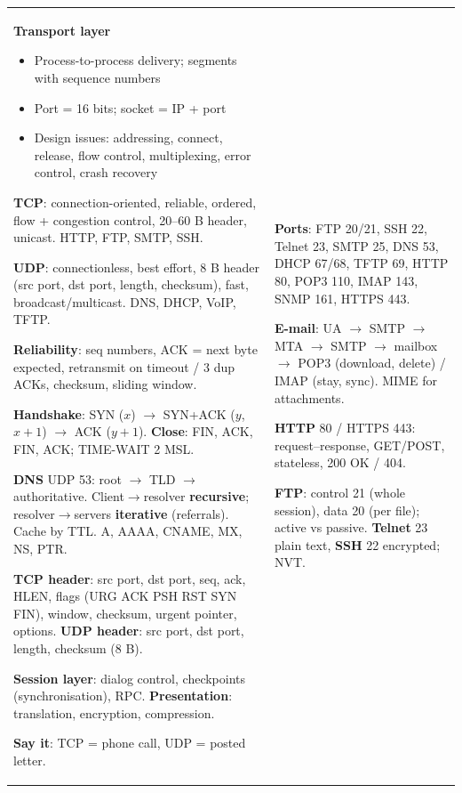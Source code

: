 \documentclass[10pt]{article}
\begin{document}
\newpage
\begin{cheatsheet}
\small
\begin{tabularx}{\linewidth}{@{}XX@{}}
\textbf{Transport layer}
\begin{itemize}
\item Process-to-process delivery; segments with sequence numbers
\item Port = 16 bits; socket = IP + port
\item Design issues: addressing, connect, release, flow control, multiplexing, error control, crash recovery
\end{itemize}
\textbf{TCP}: connection-oriented, reliable, ordered, flow + congestion control, 20--60 B header, unicast. HTTP, FTP, SMTP, SSH.\par
\textbf{UDP}: connectionless, best effort, 8 B header (src port, dst port, length, checksum), fast, broadcast/multicast. DNS, DHCP, VoIP, TFTP.

\textbf{Reliability}: seq numbers, ACK = next byte expected, retransmit on timeout / 3 dup ACKs, checksum, sliding window.

\textbf{Handshake}: SYN ($x$) $\to$ SYN+ACK ($y$, $x{+}1$) $\to$ ACK ($y{+}1$).
\textbf{Close}: FIN, ACK, FIN, ACK; TIME-WAIT 2 MSL.

\textbf{DNS} UDP 53: root $\to$ TLD $\to$ authoritative. Client$\to$resolver \textbf{recursive}; resolver$\to$servers \textbf{iterative} (referrals). Cache by TTL. A, AAAA, CNAME, MX, NS, PTR.

\textbf{TCP header}: src port, dst port, seq, ack, HLEN, flags (URG ACK PSH RST SYN FIN), window, checksum, urgent pointer, options.
\textbf{UDP header}: src port, dst port, length, checksum (8 B).

\textbf{Session layer}: dialog control, checkpoints (synchronisation), RPC.
\textbf{Presentation}: translation, encryption, compression.

\textbf{Say it}: TCP = phone call, UDP = posted letter.
&
\textbf{Ports}: FTP 20/21, SSH 22, Telnet 23, SMTP 25, DNS 53, DHCP 67/68, TFTP 69, HTTP 80, POP3 110, IMAP 143, SNMP 161, HTTPS 443.

\textbf{E-mail}: UA $\to$ SMTP $\to$ MTA $\to$ SMTP $\to$ mailbox $\to$ POP3 (download, delete) / IMAP (stay, sync). MIME for attachments.

\textbf{HTTP} 80 / HTTPS 443: request--response, GET/POST, stateless, 200 OK / 404.

\textbf{FTP}: control 21 (whole session), data 20 (per file); active vs passive.
\textbf{Telnet} 23 plain text, \textbf{SSH} 22 encrypted; NVT.


\end{tabularx}
\end{cheatsheet}
\end{document}
